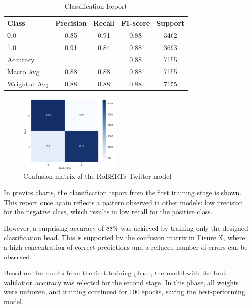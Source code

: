 \begin{table}[H]
\centering
\caption{Classification Report}
\label{tab:classification_report_2}
\begin{tabular}{lcccc}
\toprule
Class        & Precision & Recall & F1-score & Support \\
\midrule
0.0          & 0.85      & 0.91   & 0.88     & 3462    \\
1.0          & 0.91      & 0.84   & 0.88     & 3693    \\
\midrule
Accuracy     &           &        & 0.88     & 7155    \\
Macro Avg    & 0.88      & 0.88   & 0.88     & 7155    \\
Weighted Avg & 0.88      & 0.88   & 0.88     & 7155    \\
\bottomrule
\end{tabular}
\end{table}

\begin{figure}[H]
    \centering
    \includegraphics[width=0.45\textwidth]{images/robertaConfusionMatrix.png} 
    \caption{Confusion matrix of the RoBERTa-Twitter model}
    \label{fig:roberta_confusion_matrix}
\end{figure}

In previos charts, the classification report from the first training stage is shown. This report once again reflects a pattern observed in other models: low precision for the negative class, which results in low recall for the positive class. 

However, a surprising accuracy of 88\% was achieved by training only the designed classification head. This is supported by the confusion matrix in Figure X, where a high concentration of correct predictions and a reduced number of errors can be observed.

Based on the results from the first training phase, the model with the best validation accuracy was selected for the second stage. In this phase, all weights were unfrozen, and training continued for 100 epochs, saving the best-performing model.


